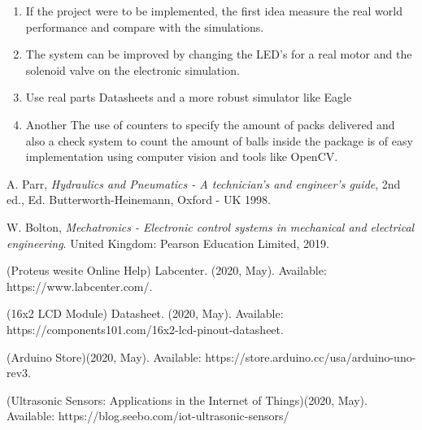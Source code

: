 \documentclass[transmag]{IEEEtran}
\begin{document}
\begin{enumerate}
\item If the project were to be implemented, the first idea measure the real world performance and compare with the simulations.
\item The system can be improved by changing the LED's for a real motor and the solenoid valve on the electronic simulation.  
\item Use real parts Datasheets and a more robust simulator like Eagle
\item Another The use of counters to specify the amount of packs delivered and also a check system to count the amount of balls inside the package is of easy implementation using computer vision and tools like OpenCV.
\end{enumerate}






\clearpage
\newpage

\begin{thebibliography}{00}

 A. Parr, \emph{Hydraulics and Pneumatics - A technician's and engineer's guide}, 2nd ed., Ed. Butterworth-Heinemann, Oxford - UK 1998.

 W. Bolton, \emph{Mechatronics - Electronic control systems in mechanical and electrical engineering}. United Kingdom: Pearson Education Limited, 2019.

 (Proteus wesite Online Help) Labcenter. (2020, May).  Available: https://www.labcenter.com/.

 (16x2 LCD Module) Datasheet. (2020, May).  Available: https://components101.com/16x2-lcd-pinout-datasheet.


 (Arduino Store)(2020, May). Available: https://store.arduino.cc/usa/arduino-uno-rev3. 

 (Ultrasonic Sensors: Applications in the Internet of Things)(2020, May). Available: https://blog.seebo.com/iot-ultrasonic-sensors/

\end{thebibliography}

\clearpage
\newpage

\onecolumn

\appendix
\end{document}
